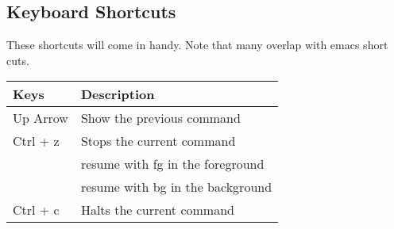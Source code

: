 \subsection{Keyboard Shortcuts}\label{keyboard-shortcuts}

These shortcuts will come in handy. Note that many overlap with emacs
short cuts.

\begin{longtable}[]{@{}ll@{}}
\toprule
\begin{minipage}[b]{0.17\columnwidth}\raggedright\strut
Keys\strut
\end{minipage} & \begin{minipage}[b]{0.77\columnwidth}\raggedright\strut
Description\strut
\end{minipage}\tabularnewline
\midrule
\endhead
\begin{minipage}[t]{0.17\columnwidth}\raggedright\strut
Up Arrow\strut
\end{minipage} & \begin{minipage}[t]{0.77\columnwidth}\raggedright\strut
Show the previous command\strut
\end{minipage}\tabularnewline
\begin{minipage}[t]{0.17\columnwidth}\raggedright\strut
Ctrl + z\strut
\end{minipage} & \begin{minipage}[t]{0.77\columnwidth}\raggedright\strut
Stops the current command\strut
\end{minipage}\tabularnewline
\begin{minipage}[t]{0.48\columnwidth}\raggedright\strut
\strut
\end{minipage} & \begin{minipage}[t]{0.48\columnwidth}\raggedright\strut
resume with fg in the foreground\strut
\end{minipage}\tabularnewline
\begin{minipage}[t]{0.48\columnwidth}\raggedright\strut
\strut
\end{minipage} & \begin{minipage}[t]{0.48\columnwidth}\raggedright\strut
resume with bg in the background\strut
\end{minipage}\tabularnewline
\begin{minipage}[t]{0.17\columnwidth}\raggedright\strut
Ctrl + c\strut
\end{minipage} & \begin{minipage}[t]{0.77\columnwidth}\raggedright\strut
Halts the current command\strut
\end{minipage}\tabularnewline

\end{longtable}

